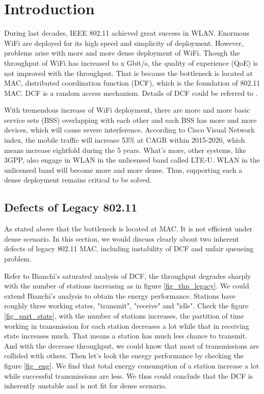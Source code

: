 \chapter{Introduction}  \label{chp_intro}
During last decades, IEEE 802.11 achieved great success in WLAN. Enormous WiFi are deployed for its high speed and simplicity of deployment. 
However, problems arise with more and more dense deployment of WiFi.
Though the throughput of WiFi has increased to x Gbit/s, the quality of experience (QoE) is not improved with the throughput.
That is because the bottleneck is located at MAC, distributed coordination function (DCF), which is the foundation of 802.11 MAC.
DCF is a random access mechanism. Details of DCF could be referred to \cite{bianchi2000performance}.

With tremendous increase of WiFi deployment, there are more and more basic service sets (BSS) overlapping with each other and each BSS has more and more devices, which will cause severe interference. 
According to Cisco Visual Network index\cite{cisco2016}, the mobile traffic will increase 53\% at CAGR within 2015-2020, which means increase eightfold during the 5 years.
What's more, other systems, like 3GPP, also engage in WLAN in the unlicensed band called LTE-U. WLAN in the unlicensed band will become more and more dense. 
Thus, supporting such a dense deployment remains critical to be solved. 

\section{Defects of Legacy 802.11}
As stated above that the bottleneck is located at MAC. It is not efficient under dense scenario.
In this section, we would discuss clearly about two inherent defects of legacy 802.11 MAC, including instability of DCF and unfair queueing problem.


\vspace*{0.5cm}

Refer to Bianchi's saturated analysis of DCF, the throughput degrades sharply with the number of stations increasing as in figure \ref{fig_thp_legacy}.
We could extend Bianchi's analysis to obtain the energy performance.
Stations have roughly three working states, "transmit", "receive" and "idle".
Check the figure \ref{fig_part_state}, with the number of stations increases, the partition of time working in transmission for each station decreases a lot while that in receiving state increases much. 
That means a station has much less chance to transmit. And with the decrease throughput, we could know that most of transmissions are collided with others. 
Then let's look the energy performance by checking the figure \ref{fig_eng}. 
We find that total energy consumption of a station increase a lot while successful transmissions are less.
We thus could conclude that the DCF is inherently unstable and is not fit for dense scenario.

